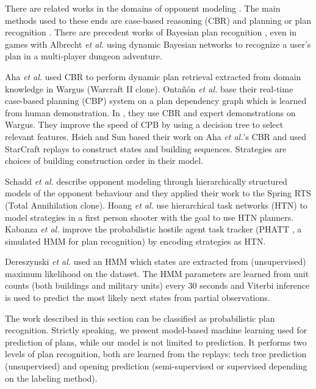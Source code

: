 There are related works in the domains of opponent modeling \citep{HsiehS08,schadd2007opponent,OBRecog}. The main methods used to these ends are case-based reasoning (CBR) and planning or plan recognition \citep{LTW,CBR_Planning,OntanonCBR,HTNPlanning,Ramirez}. There are precedent works of Bayesian plan recognition \citep{BMPR}, even in games with Albrecht \textit{et al.} \citep{BayesianRecog} using dynamic Bayesian networks to recognize a user's plan in a multi-player dungeon adventure. 

Aha \textit{et al.} \citep{LTW} used CBR to perform dynamic plan retrieval extracted from domain knowledge in Wargus (Warcraft II clone). Onta\~{n}\'{o}n \textit{et al.} \citep{CBR_Planning} base their real-time case-based planning (CBP) system on a plan dependency graph which is learned from human demonstration. In \citep{OntanonCBR,PlanRetrieval}, they use CBR and expert demonstrations on Wargus. %
They improve the speed of CPB by using a decision tree to select relevant features. Hsieh and Sun \citep{HsiehS08} based their work on Aha \textit{et al.}'s CBR \citep{LTW} and used StarCraft replays to construct states and building sequences. Strategies are choices of building construction order in their model. 

Schadd \textit{et al.} \citep{schadd2007opponent} describe opponent modeling through hierarchically structured models of the opponent behaviour and they applied their work to the Spring RTS (Total Annihilation clone). Hoang \textit{et al.} \citep{HTNPlanning} use hierarchical task networks (HTN) to model strategies in a first person shooter with the goal to use HTN planners. Kabanza \textit{et al.} \citep{OBRecog} improve the probabilistic hostile agent task tracker (PHATT \citep{PHATT}, a simulated HMM for plan recognition) by encoding strategies as HTN. 

Dereszynski \textit{et al.} \citep{HMMstrat_RTS_AIIDE11} used an HMM which states are extracted from (unsupervised) maximum likelihood on the dataset. The HMM parameters are learned from unit counts (both buildings and military units) every 30 seconds and Viterbi inference is used to predict the most likely next states from partial observations. %

The work described in this section can be classified as probabilistic plan recognition. Strictly speaking, we present model-based machine learning used for prediction of plans, while our model is not limited to prediction. It performs two levels of plan recognition, both are learned from the replays: tech tree prediction (unsupervised) and opening prediction (semi-supervised or supervised depending on the labeling method).

